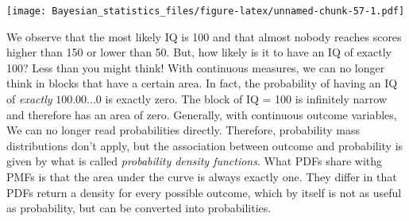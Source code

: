\documentclass[]{svmono}
\newenvironment{Shaded}{\begin{snugshade}}{\end{snugshade}}
\newcommand{\KeywordTok}[1]{\textcolor[rgb]{0.13,0.29,0.53}{\textbf{#1}}}
\newcommand{\DataTypeTok}[1]{\textcolor[rgb]{0.13,0.29,0.53}{#1}}
\newcommand{\DecValTok}[1]{\textcolor[rgb]{0.00,0.00,0.81}{#1}}
\newcommand{\StringTok}[1]{\textcolor[rgb]{0.31,0.60,0.02}{#1}}
\newcommand{\OperatorTok}[1]{\textcolor[rgb]{0.81,0.36,0.00}{\textbf{#1}}}
\newcommand{\NormalTok}[1]{#1}
\theoremstyle{definition}
\theoremstyle{definition}
\theoremstyle{definition}
\theoremstyle{remark}
\begin{document}
\begin{Shaded}
\end{Shaded}

\texttt{[image: Bayesian\_statistics\_files/figure-latex/unnamed-chunk-57-1.pdf]}

We observe that the most likely IQ is 100 and that almost nobody reaches
scores higher than 150 or lower than 50. But, how likely is it to have
an IQ of exactly 100? Less than you might think! With continuous
measures, we can no longer think in blocks that have a certain area. In
fact, the probability of having an IQ of \emph{exactly} \(100.00...0\)
is exactly zero. The block of IQ = 100 is infinitely narrow and
therefore has an area of zero. Generally, with continuous outcome
variables, We can no longer read probabilities directly. Therefore,
probability mass distributions don't apply, but the association between
outcome and probability is given by what is called \emph{probability
density functions}. What PDFs share withg PMFs is that the area under
the curve is always exactly one. They differ in that PDFs return a
density for every possible outcome, which by itself is not as useful as
probability, but can be converted into probabilities.
\end{document}
